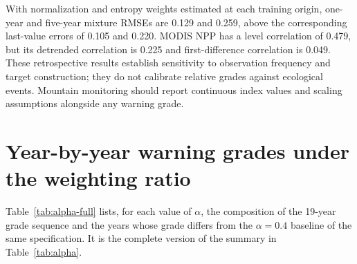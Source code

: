 \documentclass[preprint,11pt,authoryear]{elsarticle}
\begin{document}
With normalization and entropy weights estimated at each training origin, one-year and five-year mixture RMSEs are 0.129 and 0.259, above the corresponding last-value errors of 0.105 and 0.220. MODIS NPP has a level correlation of 0.479, but its detrended correlation is 0.225 and first-difference correlation is 0.049. These retrospective results establish sensitivity to observation frequency and target construction; they do not calibrate relative grades against ecological events. Mountain monitoring should report continuous index values and scaling assumptions alongside any warning grade.

\appendix

\section{Year-by-year warning grades under the weighting ratio}
\label{app:alpha}
Table~\ref{tab:alpha-full} lists, for each value of $\alpha$, the composition of the 19-year grade sequence and the years whose grade differs from the $\alpha=0.4$ baseline of the same specification. It is the complete version of the summary in Table~\ref{tab:alpha}.
\end{document}
